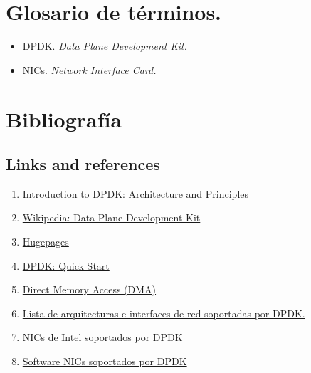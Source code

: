 \documentclass[12pt]{article}
\begin{document}
    \pagebreak
    \section{Glosario de términos.}
    \begin{itemize}
    	\item DPDK. \textit{Data Plane Development Kit.}
    	\item NICs. \textit{Network Interface Card.}
    \end{itemize}
    
    
    \pagebreak
    \section{Bibliografía}
    \subsection{Links and references}
    \begin{enumerate}
        \item 
        \label{bib:link1} \href{https://blog.selectel.com/introduction-dpdk-architecture-principles/}{Introduction to DPDK: Architecture and Principles}
        
        \item 
        \label{bib:link2}\href{https://en.wikipedia.org/wiki/Data_Plane_Development_Kit}{Wikipedia: Data Plane Development Kit}
        
        \item 
        \label{bib:link3}\href{https://wiki.debian.org/Hugepages}{Hugepages}
        
        \item
        \label{bib:link4}\href{https://core.dpdk.org/doc/quick-start/}{DPDK: Quick Start}
        
        \item
        \label{bib:link5} \href{https://techopedia.com/definition/2767/direct-memory-access-dma}{Direct Memory Access (DMA)}
        
        \item
        \label{bib:link6} \href{https://core.dpdk.org/supported/}{Lista de arquitecturas e interfaces de red soportadas por DPDK.}
        
        \item
        \label{bib:link7} \href{https://core.dpdk.org/supported/nics/intel/}{NICs de Intel soportados por DPDK}
        
        \item
        \label{bib:link8} \href{https://core.dpdk.org/supported/nics/sw/}{Software NICs soportados por DPDK}
    \end{enumerate}
\end{document}
